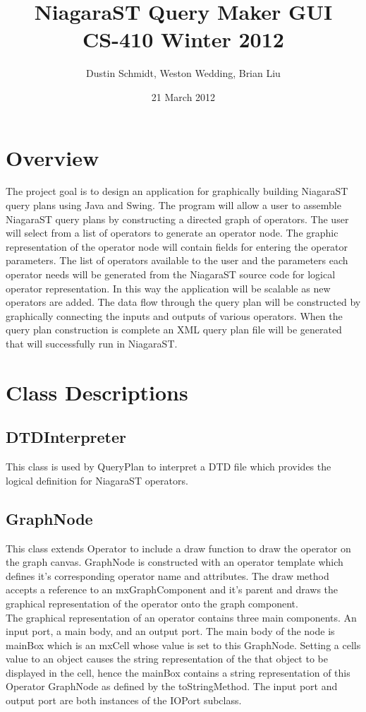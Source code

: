 \documentclass{article}
\title{NiagaraST Query Maker GUI\\
CS-410 Winter 2012}
\author{Dustin Schmidt, Weston Wedding, Brian Liu}
\date{21 March 2012}
\begin{document}
\maketitle
\tableofcontents
	\section{Overview}
	The project goal is to design an application for graphically building NiagaraST query plans using Java and Swing. The program will allow a user to assemble NiagaraST query plans by constructing a directed graph of operators.  The user will select from a list of operators to generate an operator node.  The graphic representation of the operator node will contain fields for entering the operator parameters.  The list of operators available to the user and the parameters each operator needs will be generated from the NiagaraST source code for logical operator representation.  In this way the application will be scalable as new operators are added. The data flow through the query plan will be constructed by graphically connecting the inputs and outputs of various operators.  When the query plan construction is complete an XML query plan file will be generated that will successfully run in NiagaraST. 

\section{Class Descriptions}
\subsection{DTDInterpreter} This class is used by QueryPlan to interpret a DTD file which provides the logical definition for NiagaraST operators.
\subsection{GraphNode} This class extends Operator to include a draw function to draw the operator on the graph canvas.  GraphNode is constructed with an operator template which defines it's corresponding operator name and attributes.  The draw method accepts a reference to an mxGraphComponent and it's parent and draws the graphical representation of the operator onto the graph component.\\
The graphical representation of an operator contains three main components.  An input port, a main body, and an output port.  The main body of the node is mainBox which is an mxCell whose value is set to this GraphNode.  Setting a cells value to an object causes the string representation of the that object to be displayed in the cell, hence the mainBox contains a string representation of this Operator GraphNode as defined by the toStringMethod.  The input port and output port are both instances of the IOPort subclass.
\end{document}
